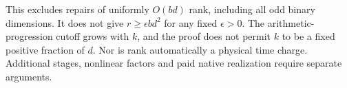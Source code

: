This excludes repairs of uniformly $O(bd)$ rank, including all odd
binary dimensions.  It does not give $r\ge\epsilon bd^2$ for any fixed
$\epsilon>0$.  The arithmetic-progression cutoff grows with $k$, and
the proof does not permit $k$ to be a fixed positive fraction of $d$.
Nor is rank automatically a physical time charge.  Additional stages,
nonlinear factors and paid native realization require separate arguments.
